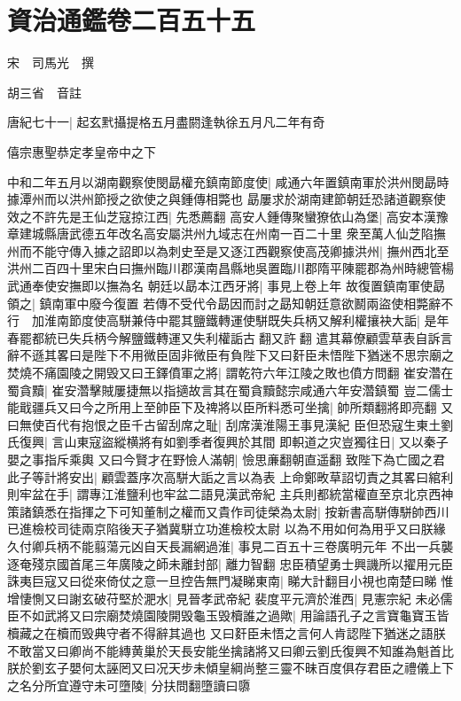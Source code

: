 \chapter{資治通鑑卷二百五十五}
宋　司馬光　撰

胡三省　音註

唐紀七十一|{
	起玄黓攝提格五月盡閼逢執徐五月凡二年有奇}


僖宗惠聖恭定孝皇帝中之下

中和二年五月以湖南觀察使閔勗權充鎮南節度使|{
	咸通六年置鎮南軍於洪州閔勗時據潭州而以洪州節授之欲使之與鍾傳相斃也}
勗屢求於湖南建節朝廷恐諸道觀察使效之不許先是王仙芝寇掠江西|{
	先悉薦翻}
高安人鍾傳聚蠻獠依山為堡|{
	高安本漢豫章建城縣唐武德五年改名高安屬洪州九域志在州南一百二十里}
衆至萬人仙芝陷撫州而不能守傳入據之詔即以為刺史至是又逐江西觀察使高茂卿據洪州|{
	撫州西北至洪州二百四十里宋白曰撫州臨川郡漢南昌縣地吳置臨川郡隋平陳罷郡為州時總管楊武通奉使安撫即以撫為名}
朝廷以勗本江西牙將|{
	事見上卷上年}
故復置鎮南軍使勗領之|{
	鎮南軍中廢今復置}
若傳不受代令勗因而討之勗知朝廷意欲鬭兩盜使相斃辭不行　加淮南節度使高駢兼侍中罷其鹽鐵轉運使駢既失兵柄又解利權攘袂大詬|{
	是年春罷都統已失兵柄今解鹽鐵轉運又失利權詬古翻又許翻}
遣其幕僚顧雲草表自訴言辭不遜其畧曰是陛下不用微臣固非微臣有負陛下又曰姧臣未悟陛下猶迷不思宗廟之焚燒不痛園陵之開毁又曰王鐸僨軍之將|{
	謂乾符六年江陵之敗也僨方問翻}
崔安濳在蜀貪黷|{
	崔安濳擊賊屢捷無以指擿故言其在蜀貪黷懿宗咸通六年安濳鎮蜀}
豈二儒士能戢疆兵又曰今之所用上至帥臣下及禆將以臣所料悉可坐擒|{
	帥所類翻將即亮翻}
又曰無使百代有抱恨之臣千古留刮席之耻|{
	刮席漢淮陽王事見漢紀}
臣但恐寇生東土劉氏復興|{
	言山東寇盜縱横將有如劉季者復興於其間}
即軹道之灾豈獨往日|{
	又以秦子嬰之事指斥乘輿}
又曰今賢才在野憸人滿朝|{
	憸思亷翻朝直遥翻}
致陛下為亡國之君此子等計將安出|{
	顧雲蓋序次高駢大詬之言以為表}
上命鄭畋草詔切責之其畧曰綰利則牢盆在手|{
	謂專江淮鹽利也牢盆二語見漢武帝紀}
主兵則都統當權直至京北京西神策諸鎮悉在指揮之下可知董制之權而又貴作司徒榮為太尉|{
	按新書高駢傳駢帥西川已進檢校司徒兩京陷後天子猶冀駢立功進檢校太尉}
以為不用如何為用乎又曰朕緣久付卿兵柄不能翦蕩元凶自天長漏網過淮|{
	事見二百五十三卷廣明元年}
不出一兵襲逐奄殘京國首尾三年廣陵之師未離封部|{
	離力智翻}
忠臣積望勇士興譏所以擢用元臣誅夷巨寇又曰從來倚仗之意一旦控告無門凝睇東南|{
	睇大計翻目小視也南楚曰睇}
惟增悽惻又曰謝玄破苻堅於淝水|{
	見晉孝武帝紀}
裴度平元濟於淮西|{
	見憲宗紀}
未必儒臣不如武將又曰宗廟焚燒園陵開毁龜玉毁櫝誰之過歟|{
	用論語孔子之言寶龜寶玉皆櫝藏之在櫝而毁典守者不得辭其過也}
又曰姧臣未悟之言何人肯認陛下猶迷之語朕不敢當又曰卿尚不能縳黄巢於天長安能坐擒諸將又曰卿云劉氏復興不知誰為魁首比朕於劉玄子嬰何太誣罔又曰况天步未傾皇綱尚整三靈不昧百度俱存君臣之禮儀上下之名分所宜遵守未可墮陵|{
	分扶問翻墮讀曰隳}
